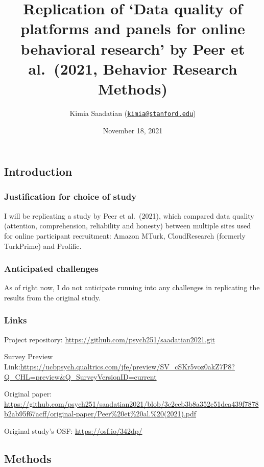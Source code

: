 \documentclass[
]{article}
\title{Replication of `Data quality of platforms and panels for online
behavioral research' by Peer et al.~(2021, Behavior Research Methods)}
\author{Kimia Saadatian
(\href{mailto:kimia@stanford.edu}{\nolinkurl{kimia@stanford.edu}})}
\date{November 18, 2021}
\begin{document}
\maketitle

{
\setcounter{tocdepth}{3}
\tableofcontents
}
\hypertarget{introduction}{%
\subsection{Introduction}\label{introduction}}

\hypertarget{justification-for-choice-of-study}{%
\subsubsection{Justification for choice of
study}\label{justification-for-choice-of-study}}

I will be replicating a study by Peer et al.~(2021), which compared data
quality (attention, comprehension, reliability and honesty) between
multiple sites used for online participant recruitment: Amazon MTurk,
CloudResearch (formerly TurkPrime) and Prolific.

\hypertarget{anticipated-challenges}{%
\subsubsection{Anticipated challenges}\label{anticipated-challenges}}

As of right now, I do not anticipate running into any challenges in
replicating the results from the original study.

\hypertarget{links}{%
\subsubsection{Links}\label{links}}

Project repository: \url{https://github.com/psych251/saadatian2021.git}

Survey Preview
Link:\url{https://ucbpsych.qualtrics.com/jfe/preview/SV_cSKr5voz0akZ7P8?Q_CHL=preview\&Q_SurveyVersionID=current}

Original paper:
\url{https://github.com/psych251/saadatian2021/blob/3c2eeb3b8a352c51dea439f7878b2ab95f67acff/original-paper/Peer\%20et\%20al.\%20(2021).pdf}

Original study's OSF: \url{https://osf.io/342dp/}

\hypertarget{methods}{%
\subsection{Methods}\label{methods}}
\end{document}
